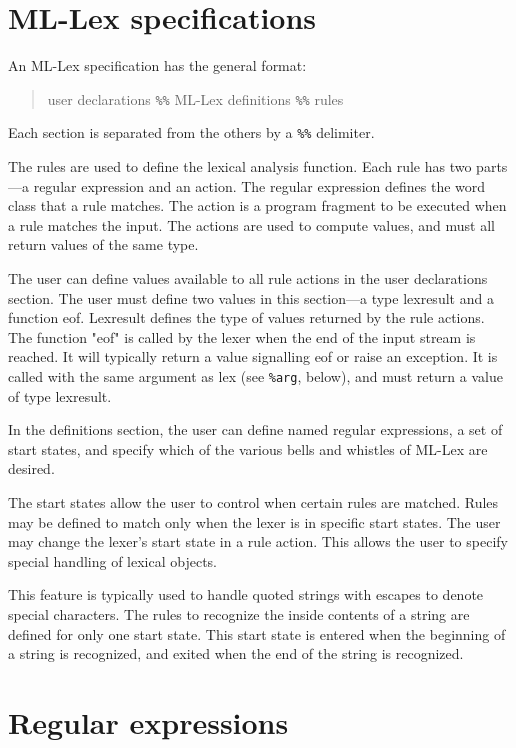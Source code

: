 \section{ML-Lex specifications}

An ML-Lex specification has the general format:

\begin{quote}
        {user declarations}
        \verb|%%|
        {ML-Lex definitions}
        \verb|%%|
        {rules}
\end{quote}

Each section is separated from the others by a \verb|%%| delimiter.

The rules are used to define the lexical analysis function.  Each
rule has two parts---a regular expression and an action.  The regular
expression defines the word class that a rule matches.  The action is
a program fragment to be executed when a rule matches the input.  The
actions are used to compute values, and must all return values of the
same type.

The user can define values available to all rule actions in the user
declarations section.  The user must define two values in this
section---a type lexresult and a function eof.  Lexresult defines the
type of values returned by the rule actions.  The function "eof" is
called by the lexer when the end of the input stream is reached.  It
will typically return a value signalling eof or raise an exception.
It is called with the same argument as lex (see \verb|%arg|, below),
and must return a value of type lexresult.

In the definitions section, the user can define named regular
expressions, a set of start states, and specify which of the various
bells and whistles of ML-Lex are desired.

The start states allow the user to control when certain rules are
matched.  Rules may be defined to match only when the lexer is in
specific start states.  The user may change the lexer's start state
in a rule action.  This allows the user to specify special handling
of lexical objects.

This feature is typically used to handle quoted strings with escapes
to denote special characters.  The rules to recognize the inside
contents of a string are defined for only one start state.  This
start state is entered when the beginning of a string is recognized,
and exited when the end of the string is recognized.

\section{Regular expressions}

